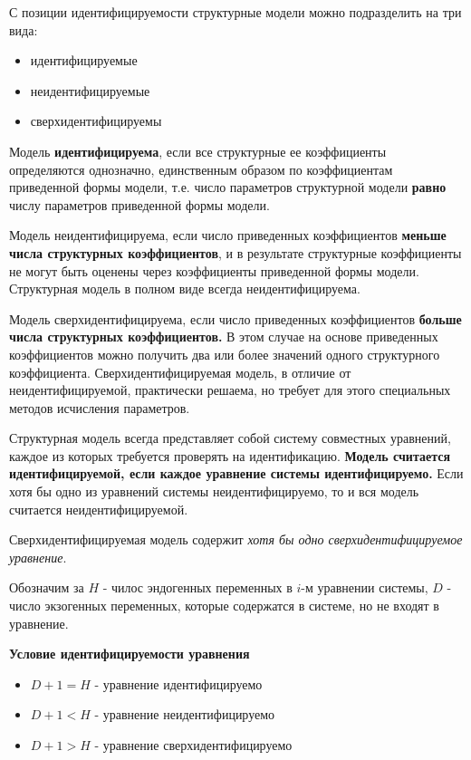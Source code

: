 \documentclass[aps,%
12pt,%
final,%
oneside,
onecolumn,%
musixtex, %
superscriptaddress,%
centertags]{article} %
\begin{document}
С позиции идентифицируемости структурные модели можно подразделить на три вида:

\begin{itemize}
	\item идентифицируемые
	\item неидентифицируемые
	\item сверхидентифицируемы
\end{itemize}

Модель \textbf{идентифицируема}, если все структурные ее коэффициенты определяются однозначно, единственным образом по коэффициентам приведенной формы модели, т.е. число параметров структурной модели \textbf{равно} числу параметров приведенной формы модели.

Модель неидентифицируема, если число приведенных коэффициентов \textbf{меньше числа структурных коэффициентов}, и в результате структурные коэффициенты не могут быть оценены через коэффициенты приведенной формы модели. Структурная модель в полном виде всегда неидентифицируема.

Модель сверхидентифицируема, если число приведенных коэффициентов \textbf{больше числа структурных коэффициентов.} В этом случае на основе приведенных коэффициентов можно получить два или более значений одного структурного коэффициента. Сверхидентифицируемая модель, в отличие от неидентифицируемой, практически решаема, но требует для этого специальных методов исчисления параметров.

Структурная модель всегда представляет собой систему совместных уравнений, каждое из которых требуется проверять на идентификацию. \textbf{Модель считается идентифицируемой, если каждое уравнение системы идентифицируемо.} Если хотя бы одно из уравнений системы неидентифицируемо, то и вся модель считается неидентифицируемой. 

Сверхидентифицируемая модель содержит \textit{хотя бы одно сверхидентифицируемое уравнение}.

Обозначим за $H$ - чилос эндогенных переменных в $i$-м уравнении системы, $D$ - число экзогенных переменных, которые содержатся в системе, но не входят в уравнение. 

\textbf{Условие идентифицируемости уравнения}

\begin{itemize}
	\item $D+1 = H$ - уравнение идентифицируемо
	\item $D+1 < H$ - уравнение неидентифицируемо
	\item $D+1 > H$ - уравнение сверхидентифицируемо
\end{itemize}
\end{document}
